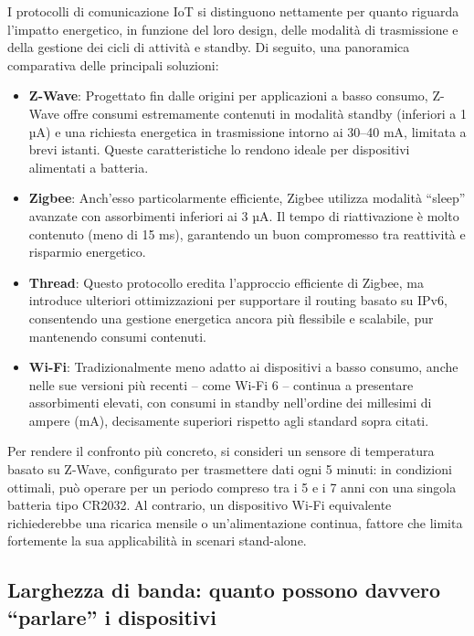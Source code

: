 I protocolli di comunicazione IoT si distinguono nettamente per quanto riguarda l’impatto energetico, in funzione del loro design, delle modalità di trasmissione e della gestione dei cicli di attività e standby. Di seguito, una panoramica comparativa delle principali soluzioni:

\begin{itemize}
    \item \textbf{Z-Wave}: Progettato fin dalle origini per applicazioni a basso consumo, Z-Wave offre consumi estremamente contenuti in modalità standby (inferiori a 1 µA) e una richiesta energetica in trasmissione intorno ai 30–40 mA, limitata a brevi istanti. Queste caratteristiche lo rendono ideale per dispositivi alimentati a batteria.
   \item \textbf{Zigbee}: Anch’esso particolarmente efficiente, Zigbee utilizza modalità “sleep” avanzate con assorbimenti inferiori ai 3 µA. Il tempo di riattivazione è molto contenuto (meno di 15 ms), garantendo un buon compromesso tra reattività e risparmio energetico.

    \item \textbf{Thread}: Questo protocollo eredita l’approccio efficiente di Zigbee, ma introduce ulteriori ottimizzazioni per supportare il routing basato su IPv6, consentendo una gestione energetica ancora più flessibile e scalabile, pur mantenendo consumi contenuti.

    \item \textbf{Wi-Fi}: Tradizionalmente meno adatto ai dispositivi a basso consumo, anche nelle sue versioni più recenti – come Wi-Fi 6 – continua a presentare assorbimenti elevati, con consumi in standby nell’ordine dei millesimi di ampere (mA), decisamente superiori rispetto agli standard sopra citati.
\end{itemize}

Per rendere il confronto più concreto, si consideri un sensore di temperatura basato su Z-Wave, configurato per trasmettere dati ogni 5 minuti: in condizioni ottimali, può operare per un periodo compreso tra i 5 e i 7 anni con una singola batteria tipo CR2032. Al contrario, un dispositivo Wi-Fi equivalente richiederebbe una ricarica mensile o un’alimentazione continua, fattore che limita fortemente la sua applicabilità in scenari stand-alone.

\subsection{Larghezza di banda: quanto possono davvero ``parlare'' i dispositivi}

